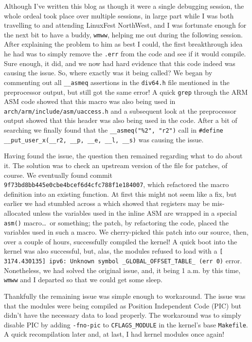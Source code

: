 \documentclass{article}
\begin{document}
Although I've written this blog as though it were a single debugging session, the whole ordeal took place over multiple sessions, in large part while I was both travelling to and attending LinuxFest NorthWest, and I was fortunate enough for the next bit to have a buddy, \texttt{wmww}, helping me out during the following session.  After explaining the problem to him as best I could, the first breakthrough idea he had was to simply remove the \texttt{.err} from the code and see if it would compile.  Sure enough, it did, and we now had hard evidence that this code indeed was causing the issue.  So, where exactly was it being called?  We began by commenting out all \texttt{__asmeq} assertions in the \texttt{div64.h} file mentioned in the preprocessor output, but still got the same error!  A quick \texttt{grep} through the ARM ASM code showed that this macro was also being used in \texttt{arch/arm/include/asm/uaccess.h} and a subsequent look at the preprocessor output showed that this header was also being used in the code.  After a bit of searching we finally found that the \texttt{__asmeq("\%2", "r2")} call in \verb|#define __put_user_x(__r2, __p, __e, __l, __s)| was causing the issue.

Having found the issue, the question then remained regarding what to do about it.  The solution was to check an upstream version of the file for patches, of course.  We eventually found commit \texttt{9f73bd8bb445e0cbe4bcef6d4cfc788f1e184007}, which refactored the macro definition into an existing function.  At first this might not seem like a fix, but earlier we had stumbled across a  which showed that registers may be mis-allocated unless the variables used in the inline ASM are wrapped in a special \texttt{asm()} macro\ldots~or something; the patch, by refactoring the code, placed the variables used in such a macro.  We cherry-picked this patch into our source, then, over a couple of hours, successfully compiled the kernel!  A quick boot into the kernel was also successful, but, alas, the modules refused to load with a \verb|[ 3174.430135] ipv6: Unknown symbol _GLOBAL_OFFSET_TABLE_ (err 0)| error.  Nonetheless, we had solved the original issue, and, it being 1 a.m. by this time, \texttt{wmww} and I departed so that we could get some sleep.

Thankfully the remaining issue was simple enough to workaround.  The issue was that the modules were being compiled as Position Independent Code (PIC) but didn't have the necessary data to load properly.  The workaround was to simply disable PIC by adding \texttt{-fno-pic} to \texttt{CFLAGS_MODULE} in the kernel's base \texttt{Makefile}.  A quick recompilation later and, at last, I had kernel modules once again!
\end{document}
